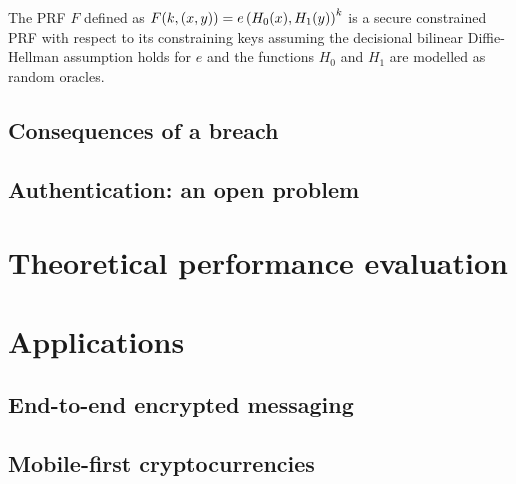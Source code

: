 		
		
		\begin{theorem}
			The PRF $F$ defined as $F(k, (x,y)) = e\left(H_0(x), H_1(y) \right)^k$ is a secure constrained PRF with respect to its constraining keys assuming the decisional bilinear Diffie-Hellman assumption holds for $e$ and the functions $H_0$ and $H_1$ are modelled as random oracles.
		\end{theorem}
		


	\subsection{Consequences of a breach}
	
	\subsection{Authentication: an open problem}


\section{Theoretical performance evaluation}
\label{sec:performance}


\section{Applications}
\label{sec:applications}

	\subsection{End-to-end encrypted messaging}
	
	\subsection{Mobile-first cryptocurrencies}
